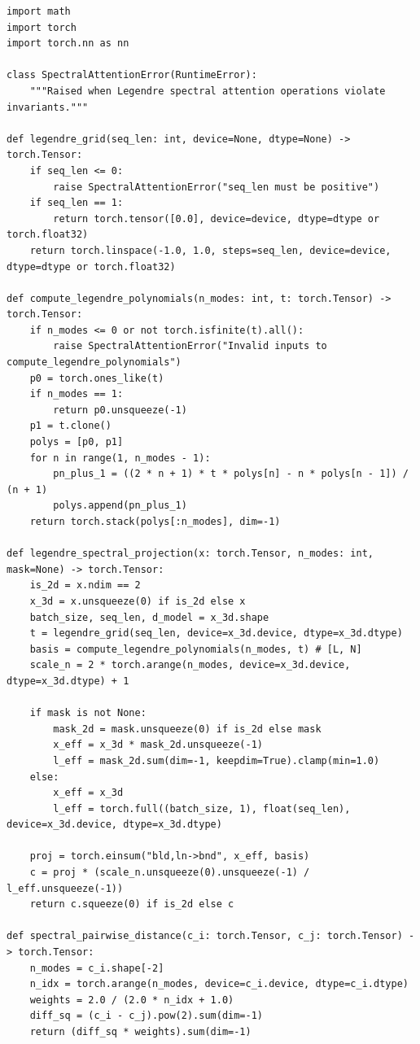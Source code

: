 \documentclass{article}
\newcommand{\slr}{\textsc{SLR}\xspace}
\begin{document}
\begin{lstlisting}[caption={PyTorch implementation of Spectral Legendre Routing (\slr)},label={lst:spectral_attention}]
import math
import torch
import torch.nn as nn

class SpectralAttentionError(RuntimeError):
    """Raised when Legendre spectral attention operations violate invariants."""

def legendre_grid(seq_len: int, device=None, dtype=None) -> torch.Tensor:
    if seq_len <= 0:
        raise SpectralAttentionError("seq_len must be positive")
    if seq_len == 1:
        return torch.tensor([0.0], device=device, dtype=dtype or torch.float32)
    return torch.linspace(-1.0, 1.0, steps=seq_len, device=device, dtype=dtype or torch.float32)

def compute_legendre_polynomials(n_modes: int, t: torch.Tensor) -> torch.Tensor:
    if n_modes <= 0 or not torch.isfinite(t).all():
        raise SpectralAttentionError("Invalid inputs to compute_legendre_polynomials")
    p0 = torch.ones_like(t)
    if n_modes == 1:
        return p0.unsqueeze(-1)
    p1 = t.clone()
    polys = [p0, p1]
    for n in range(1, n_modes - 1):
        pn_plus_1 = ((2 * n + 1) * t * polys[n] - n * polys[n - 1]) / (n + 1)
        polys.append(pn_plus_1)
    return torch.stack(polys[:n_modes], dim=-1)

def legendre_spectral_projection(x: torch.Tensor, n_modes: int, mask=None) -> torch.Tensor:
    is_2d = x.ndim == 2
    x_3d = x.unsqueeze(0) if is_2d else x
    batch_size, seq_len, d_model = x_3d.shape
    t = legendre_grid(seq_len, device=x_3d.device, dtype=x_3d.dtype)
    basis = compute_legendre_polynomials(n_modes, t) # [L, N]
    scale_n = 2 * torch.arange(n_modes, device=x_3d.device, dtype=x_3d.dtype) + 1
    
    if mask is not None:
        mask_2d = mask.unsqueeze(0) if is_2d else mask
        x_eff = x_3d * mask_2d.unsqueeze(-1)
        l_eff = mask_2d.sum(dim=-1, keepdim=True).clamp(min=1.0)
    else:
        x_eff = x_3d
        l_eff = torch.full((batch_size, 1), float(seq_len), device=x_3d.device, dtype=x_3d.dtype)
        
    proj = torch.einsum("bld,ln->bnd", x_eff, basis)
    c = proj * (scale_n.unsqueeze(0).unsqueeze(-1) / l_eff.unsqueeze(-1))
    return c.squeeze(0) if is_2d else c

def spectral_pairwise_distance(c_i: torch.Tensor, c_j: torch.Tensor) -> torch.Tensor:
    n_modes = c_i.shape[-2]
    n_idx = torch.arange(n_modes, device=c_i.device, dtype=c_i.dtype)
    weights = 2.0 / (2.0 * n_idx + 1.0)
    diff_sq = (c_i - c_j).pow(2).sum(dim=-1)
    return (diff_sq * weights).sum(dim=-1)
\end{lstlisting}
\end{document}
